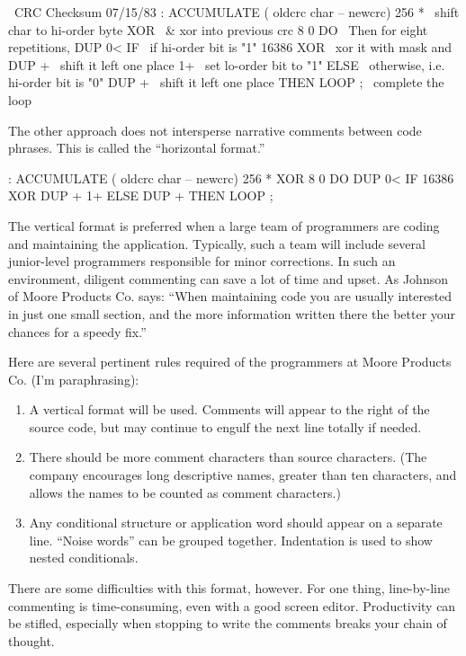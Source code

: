 \begin{Code}
\ CRC Checksum                                          07/15/83
: ACCUMULATE   ( oldcrc char -- newcrc)
   256 *                   \ shift char to hi-order byte
   XOR                     \ & xor into previous crc
   8 0 DO                  \ Then for eight repetitions,
       DUP 0< IF           \ if hi-order bit is "1"
          16386 XOR        \ xor it with mask and
          DUP +            \ shift it left one place
          1+               \ set lo-order bit to "1"
              ELSE         \ otherwise, i.e. hi-order bit is "0"
          DUP +            \ shift it left one place
              THEN
       LOOP ;              \ complete the loop

\end{Code}
The other approach does not intersperse narrative comments between
code phrases.  This is called the ``horizontal format.''
\begin{Code}
: ACCUMULATE  ( oldcrc char -- newcrc)
   256 *  XOR  8 0 DO  DUP 0< IF
      16386 XOR  DUP +  1+  ELSE  DUP +  THEN  LOOP ;
\end{Code}
The vertical format is preferred when a large team of programmers are
coding and maintaining the application.  Typically, such a team will
include several junior-level programmers responsible for minor
corrections.  In such an environment, diligent commenting can save a
lot of time and upset.  As Johnson of Moore
Products Co.  says: ``When maintaining code you are usually interested
in just one small section, and the more information written there the
better your chances for a speedy fix.''

Here are several pertinent rules required of the \Forth{} programmers
at Moore Products Co. (I'm paraphrasing):

\begin{enumerate}
\item A vertical format will be used.  Comments will appear to the
right of the source code, but may continue to engulf the next line
totally if needed.
\item There should be more comment characters than source characters.
(The company encourages long descriptive names, greater than ten
characters, and allows the names to be counted as comment characters.)
\item Any conditional structure or application word should appear on a
separate line.  ``Noise words'' can be grouped together.  Indentation
is used to show nested conditionals.
\end{enumerate}
There are some difficulties with this format, however.
For one thing, line-by-line commenting is time-consuming, even with a
good screen editor.  Productivity can be stifled, especially when
stopping to write the comments breaks your chain of thought.

